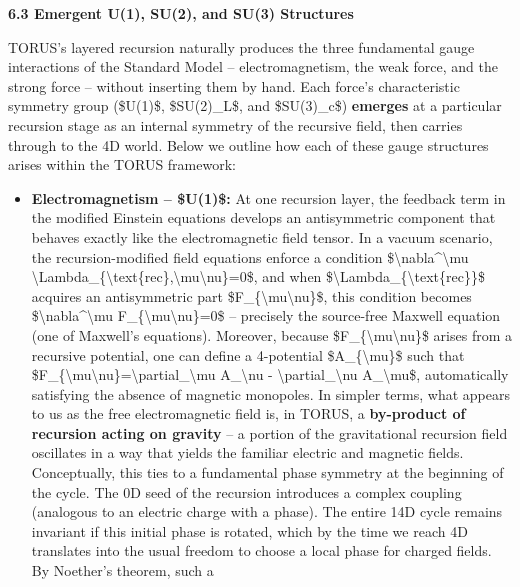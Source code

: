 \textbf{6.3 Emergent U(1), SU(2), and SU(3) Structures}

TORUS's layered recursion naturally produces the three fundamental gauge
interactions of the Standard Model -- electromagnetism, the weak force,
and the strong force -- without inserting them by hand. Each force's
characteristic symmetry group (\$U(1)\$, \$SU(2)\_L\$, and \$SU(3)\_c\$)
\textbf{emerges} at a particular recursion stage as an internal symmetry
of the recursive field, then carries through to the 4D world. Below we
outline how each of these gauge structures arises within the TORUS
framework:

\begin{itemize}
\item
  \textbf{Electromagnetism -- \$U(1)\$:} At one recursion layer, the
  feedback term in the modified Einstein equations develops an
  antisymmetric component that behaves exactly like the electromagnetic
  field tensor. In a vacuum scenario, the recursion-modified field
  equations enforce a condition
  \$\textbackslash{}nabla\^{}\textbackslash{}mu
  \textbackslash{}Lambda\_\{\textbackslash{}text\{rec\},\textbackslash{}mu\textbackslash{}nu\}=0\$,
  and when \$\textbackslash{}Lambda\_\{\textbackslash{}text\{rec\}\}\$
  acquires an antisymmetric part
  \$F\_\{\textbackslash{}mu\textbackslash{}nu\}\$, this condition
  becomes \$\textbackslash{}nabla\^{}\textbackslash{}mu
  F\_\{\textbackslash{}mu\textbackslash{}nu\}=0\$ -- precisely the
  source-free Maxwell equation (one of Maxwell's equations)​. Moreover,
  because \$F\_\{\textbackslash{}mu\textbackslash{}nu\}\$ arises from a
  recursive potential, one can define a 4-potential
  \$A\_\{\textbackslash{}mu\}\$ such that
  \$F\_\{\textbackslash{}mu\textbackslash{}nu\}=\textbackslash{}partial\_\textbackslash{}mu
  A\_\textbackslash{}nu - \textbackslash{}partial\_\textbackslash{}nu
  A\_\textbackslash{}mu\$, automatically satisfying the absence of
  magnetic monopoles​. In simpler terms, what appears to us as the free
  electromagnetic field is, in TORUS, a \textbf{by-product of recursion
  acting on gravity} -- a portion of the gravitational recursion field
  oscillates in a way that yields the familiar electric and magnetic
  fields​. Conceptually, this ties to a fundamental phase symmetry at
  the beginning of the cycle. The 0D seed of the recursion introduces a
  complex coupling (analogous to an electric charge with a phase). The
  entire 14D cycle remains invariant if this initial phase is rotated,
  which by the time we reach 4D translates into the usual freedom to
  choose a local phase for charged fields​. By Noether's theorem, such a

\end{itemize}
